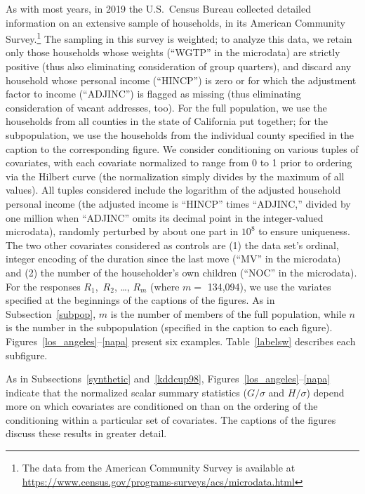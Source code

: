 \documentclass{article}
\begin{document}
As with most years, in 2019 the U.S.\ Census Bureau collected
detailed information on an extensive sample of households,
in its American Community Survey.\footnote{The data
from the American Community Survey is available
at \url{https://www.census.gov/programs-surveys/acs/microdata.html}}
The sampling in this survey is weighted; to analyze this data,
we retain only those households whose weights (``WGTP'' in the microdata)
are strictly positive (thus also eliminating consideration of group quarters),
and discard any household whose personal income (``HINCP'') is zero
or for which the adjustment factor to income (``ADJINC'') is flagged
as missing (thus eliminating consideration of vacant addresses, too).
For the full population, we use the households from all counties
in the state of California put together; for the subpopulation,
we use the households from the individual county specified in the caption
to the corresponding figure.
We consider conditioning on various tuples of covariates, with each covariate
normalized to range from 0 to 1 prior to ordering via the Hilbert curve
(the normalization simply divides by the maximum of all values).
All tuples considered include the logarithm
of the adjusted household personal income
(the adjusted income is ``HINCP'' times ``ADJINC,'' divided by one million
when ``ADJINC'' omits its decimal point in the integer-valued microdata),
randomly perturbed by about one part in $10^8$ to ensure uniqueness.
The two other covariates considered as controls are
(1) the data set's ordinal, integer encoding of the duration
since the last move (``MV'' in the microdata) and
(2) the number of the householder's own children (``NOC'' in the microdata).
For the responses $R_1$,~$R_2$, \dots, $R_m$ (where $m =$ 134,094),
we use the variates specified at the beginnings of the captions of the figures.
As in Subsection~\ref{subpop}, $m$ is the number of members
of the full population, while $n$ is the number in the subpopulation
(specified in the caption to each figure).
Figures~\ref{los_angeles}--\ref{napa} present six examples.
Table~\ref{labelsw} describes each subfigure.

As in Subsections~\ref{synthetic} and~\ref{kddcup98},
Figures~\ref{los_angeles}--\ref{napa} indicate that 
the normalized scalar summary statistics ($G/\sigma$ and $H/\sigma$)
depend more on which covariates are conditioned on
than on the ordering of the conditioning within a particular set of covariates.
The captions of the figures discuss these results in greater detail.
\end{document}
